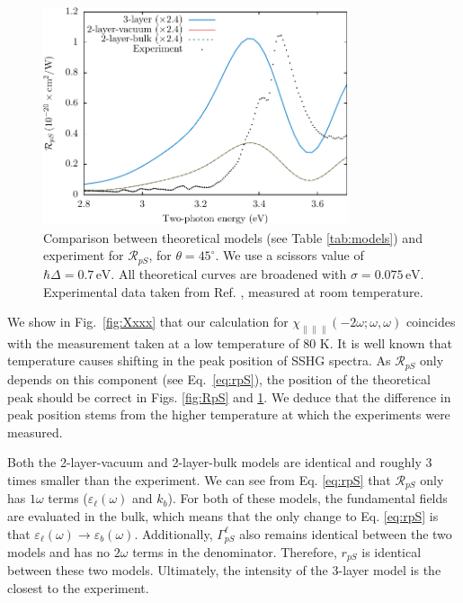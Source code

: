 \documentclass[11pt]{book}
\begin{document}
\begin{figure}
\centering
\includegraphics[width=0.8\textwidth]{../figures/04-results/fig-4_4_02}
\caption{Comparison between theoretical models (see Table
\ref{tab:models}) and experiment for $\mathcal{R}_{pS}$, for $\theta=45^\circ$.
We use a scissors value of $\hbar\Delta = 0.7\,\text{eV}$. All theoretical
curves are broadened with $\sigma=0.075\,\text{eV}$. Experimental data taken
from Ref. \cite{mitchellSS01}, measured at room temperature.}
\label{fig:mitchellRpS}
\end{figure}

We show in Fig.~\ref{fig:Xxxx} that our calculation for $\chi_{\parallel\parallel\parallel}(-2\omega;\omega,\omega)$ coincides with the measurement taken at a low temperature of 80 K. It is well known that temperature causes shifting in the peak position of SSHG spectra.\cite{dadapPRB97} As $\mathcal{R}_{pS}$ only depends on this component (see Eq.~\eqref{eq:rpS}), the position of the theoretical peak should be correct in Figs. \ref{fig:RpS} and \ref{fig:mitchellRpS}. We deduce that the difference in peak position stems from the higher  temperature at which the experiments were measured.

Both the 2-layer-vacuum and 2-layer-bulk models are identical and roughly 3 times smaller than the experiment. We can see from Eq. \eqref{eq:rpS} that $\mathcal{R}_{pS}$ only has $1\omega$ terms ($\varepsilon_{\ell}(\omega)$ and $k_{b}$). For both of these models, the fundamental fields are evaluated in the bulk, which means that the only change to Eq. \eqref{eq:rpS} is that $\varepsilon_{\ell}(\omega) \rightarrow \varepsilon_{b}(\omega)$. Additionally, $\Gamma^{\ell}_{pS}$ also remains identical between the two models and has no $2\omega$ terms in the denominator. Therefore, $r_{pS}$ is identical between these two models. Ultimately, the intensity of the 3-layer model is the closest to the experiment.
\end{document}
